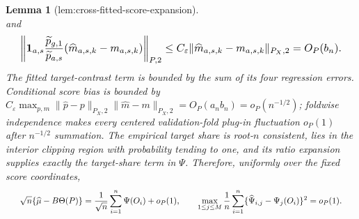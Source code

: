 \documentclass{article}
\newtheorem{lemma}{Lemma}
\begin{document}
\begin{lemma}[lem:cross-fitted-score-expansion]
\[\] and \[
\makebox[\linewidth][c]{\resizebox{0.98\linewidth}{!}{\leavevmode\par\noindent \makebox[\linewidth][c]{\resizebox{0.98\linewidth}{!}{\(\displaystyle \displaystyle \left\|\mathbf 1_{a,s}\frac{\widetilde p_{g,1}}{\widetilde p_{a,s}}(\widehat m_{a,s,k}-m_{a,s,k})\right\|_{P,2}\le C_\varepsilon\|\widehat m_{a,s,k}-m_{a,s,k}\|_{P_X,2}=O_P(b_n).\)}}\par\noindent}}
\] The fitted target-contrast term is bounded by the sum of its four regression errors. Conditional score bias is bounded by \(C_\varepsilon\max_{p,m}\|\widehat p-p\|_{P_X,2}\|\widehat m-m\|_{P_X,2}=O_P(a_nb_n)=o_P(n^{-1/2})\); foldwise independence makes every centered validation-fold plug-in fluctuation \(o_P(1)\) after \(n^{-1/2}\) summation. The empirical target share is root-\(n\) consistent, lies in the interior clipping region with probability tending to one, and its ratio expansion supplies exactly the target-share term in \(\Psi\). Therefore, uniformly over the fixed score coordinates, \[
\makebox[\linewidth][c]{\resizebox{0.98\linewidth}{!}{\leavevmode\par\noindent \makebox[\linewidth][c]{\resizebox{0.98\linewidth}{!}{\(\displaystyle \displaystyle \sqrt n\{\widehat\mu-B\Theta(P)\}=\frac1{\sqrt n}\sum_{i=1}^n\Psi(O_i)+o_P(1),\qquad \max_{1\le j\le M}\frac1n\sum_{i=1}^n\{\widehat\Psi_{i,j}-\Psi_j(O_i)\}^2=o_P(1).\)}}\par\noindent}}
\]
\end{lemma}
\end{document}
